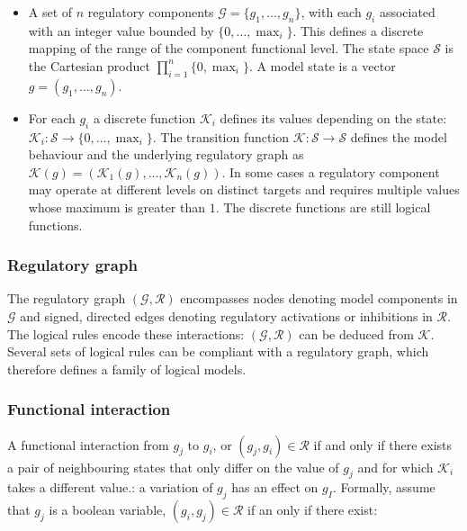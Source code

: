   \begin{multicols}{2}
    \begin{itemize}
      \item A set of $n$ regulatory components $\mathcal{G} = \{g_1, \dots, g_n\}$, with each $g_i$ associated with an integer value bounded by $\{0, \dots, \max_i\}$.
        This defines a discrete mapping of the range of the component functional level.
        The state space $\mathcal{S}$ is the Cartesian product $\prod\limits_{i=1}^n\{0, \max_i\}$.
        A model state is a vector $g = (g_1, \dots, g_n)$.
      \item For each $g_i$ a discrete function $\mathcal{K}_i$ defines its values depending on the state: $\mathcal{K}_i:\mathcal{S}\rightarrow\{0, \dots,\max_i\}$.
        The transition function $\mathcal{K}:\mathcal{S}\rightarrow\mathcal{S}$ defines the model behaviour and the underlying regulatory graph as $\mathcal{K}(g) = (\mathcal{K}_1(g), \dots, \mathcal{K}_n(g))$.
        In some cases a regulatory component may operate at different levels on distinct targets and requires multiple values whose maximum is greater than $1$.
        The discrete functions are still logical functions.
    \end{itemize}
  \end{multicols}

    \subsubsection{Regulatory graph}
    The regulatory graph $(\mathcal{G}, \mathcal{R})$ encompasses nodes denoting model components in $\mathcal{G}$ and signed, directed edges denoting regulatory activations or inhibitions in $\mathcal{R}$.
    The logical rules encode these interactions: $(\mathcal{G}, \mathcal{R})$ can be deduced from $\mathcal{K}$.
    Several sets of logical rules can be compliant with a regulatory graph, which therefore defines a family of logical models.

    \subsubsection{Functional interaction}
    A functional interaction from $g_j$ to $g_i$, or $(g_j, g_i)\in \mathcal{R}$ if and only if there exists a pair of neighbouring states that only differ on the value of $g_j$ and for which $\mathcal{K}_i$ takes a different value.: a variation of $g_j$ has an effect on $g_I$.
    Formally, assume that $g_j$ is a boolean variable, $(g_i, g_j)\in\mathcal{R}$ if an only if there exist:

